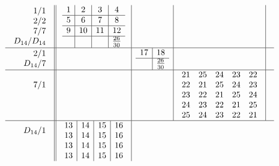 \documentclass[12pt,a4paper]{amsart}
\begin{document}
\scriptsize {}
\begin{align*}
  \begin{array}{r||c|c|c|c}
    \begin{array}{r}
      1/1 \\ 2/2 \\ 7/7 \\ D_{14}/D_{14}
    \end{array}
    &
    \begin{array}{c|c|c|c}
1&2&3&4\\\hline
5&6&7&8\\\hline
9&10&11&12\\\hline
&&&^{\underline{26}}_{30}\\
    \end{array}
&&&\\\hline
    \begin{array}{r}
      2/1 \\ D_{14}/7
    \end{array}
&&
    \begin{array}{c|c}
      17&18\\\hline
      &^{\underline{26}}_{30}\\
    \end{array}
&&\\\hline
    \begin{array}{r}
      7/1 \\ \\ \\
    \end{array}
&
&
&
\begin{array}{rrrrr}%
21&25&24&23&22\\%
22&21&25&24&23\\%
23&22&21&25&24\\%
24&23&22&21&25\\%
25&24&23&22&21\\%
\end{array}
&\\\hline
    \begin{array}{r}
      D_{14}/1 \\  \\ \\
    \end{array}
&
    \begin{array}{c|c|c|c}
13&14&15&16\\
13&14&15&16\\
13&14&15&16\\
13&14&15&16\\

\end{array}
\end{array}
\end{align*}
\end{document}
